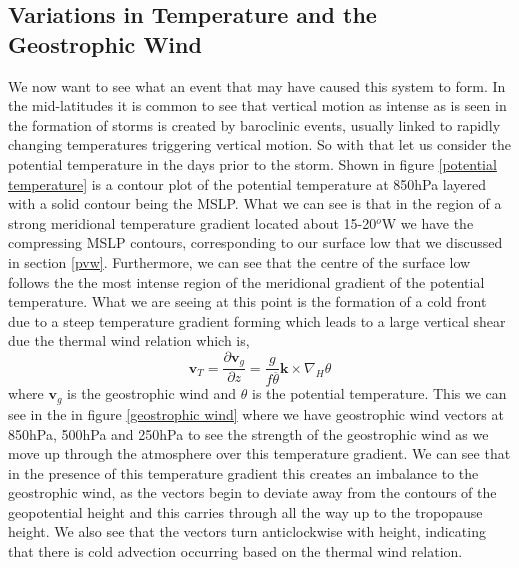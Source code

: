 \documentclass[12pt,a4paper]{article}
\begin{document}
\subsection{Variations in Temperature and the Geostrophic Wind}
We now want to see what an event that may have caused this system to form. In the mid-latitudes it is common to see that vertical motion as intense as is seen in the formation of storms is created by baroclinic events, usually linked to rapidly changing temperatures triggering vertical motion. So with that let us consider the potential temperature in the days prior to the storm. Shown in figure \ref{potential temperature} is a contour plot of the potential temperature at 850hPa layered with a solid contour being the MSLP. What we can see is that in the region of a strong meridional temperature gradient located about 15-20$^o$W we have the compressing MSLP contours, corresponding to our surface low that we discussed in section \ref{pvw}. Furthermore, we can see that the centre of the surface low follows the the most intense region of the meridional gradient of the potential temperature. What we are seeing at this point is the formation of a cold front due to a steep temperature gradient forming which leads to a large vertical shear due the thermal wind relation which is,
\begin{equation}
\bm{v}_T = \frac{\partial \bm{v}_g}{\partial z} = \frac{g}{f\overline{\theta}}\bm{k}\times\nabla_H\theta
\end{equation}
where $\bm{v}_g$ is the geostrophic wind and $\theta$ is the potential temperature. This we can see in the in figure \ref{geostrophic wind} where we have geostrophic wind vectors at 850hPa, 500hPa and 250hPa to see the strength of the geostrophic wind as we move up through the atmosphere over this temperature gradient. We can see that in the presence of this temperature gradient this creates an imbalance to the geostrophic wind, as the vectors begin to deviate away from the contours of the geopotential height and this carries through all the way up to the tropopause height. We also see that the vectors turn anticlockwise with height, indicating that there is cold advection occurring based on the thermal wind relation. 
\end{document}
